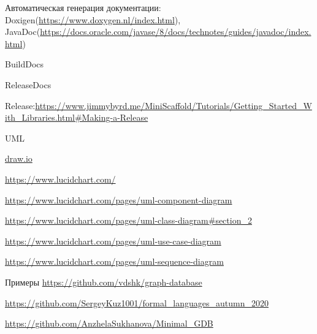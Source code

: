 Автоматическая генерация документации: Doxigen(\url{https://www.doxygen.nl/index.html}),
JavaDoc(\url{https://docs.oracle.com/javase/8/docs/technotes/guides/javadoc/index.html})

BuildDocs

ReleaseDocs

Release:\url{https://www.jimmybyrd.me/MiniScaffold/Tutorials/Getting_Started_With_Libraries.html#Making-a-Release}

UML

\url{draw.io}

\url{https://www.lucidchart.com/}

\url{https://www.lucidchart.com/pages/uml-component-diagram}

\url{https://www.lucidchart.com/pages/uml-class-diagram#section_2}

\url{https://www.lucidchart.com/pages/uml-use-case-diagram}

\url{https://www.lucidchart.com/pages/uml-sequence-diagram}


Примеры
\url{https://github.com/vdshk/graph-database}

\url{https://github.com/SergeyKuz1001/formal_languages_autumn_2020}

\url{https://github.com/AnzhelaSukhanova/Minimal_GDB}